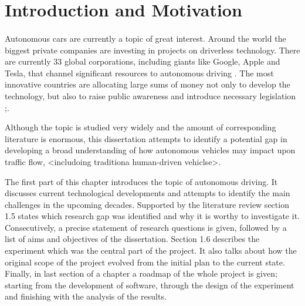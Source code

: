 \documentclass[11pt,english]{article}
\begin{document}
\tableofcontents %


\newpage

\section{Introduction and Motivation} %

\paragraph{}
Autonomous cars are currently a topic of  great interest.  Around the world the biggest private companies are investing in projects on driverless technology. There are currently 33 global corporations, including giants like Google, Apple and Tesla, that channel significant resources to autonomous driving \citep{33comp}. The most innovative countries are allocating large sums of money not only to develop the technology, but also to raise public awareness and introduce necessary legislation \citep{pathwaytodriverless};\citep{pathwaytodriverless2}. 

\par
Although the topic is studied very widely and the amount of corresponding literature is enormous, this dissertation attempts to identify a potential gap in developing a broad understanding of how autonomous vehicles may impact upon traffic flow, <includoing traditiona human-driven vehiclse>. 



\par
The first part of this chapter introduces the topic of autonomous driving. It discusses current technological developments and attempts to identify the main challenges in the upcoming decades. Supported by the literature review section 1.5 states which research gap was identified and why it is worthy to investigate it. Consecutively, a precise statement of research questions is given, followed by a list of aims and objectives of the dissertation. Section 1.6 describes the experiment which was the central part of the project. It also talks about how the original scope of the project evolved from the initial plan to the current state. Finally, in last section of a chapter a roadmap of the whole project is given; starting from the development of software, through the design of the experiment and finishing with the analysis of the results.
\end{document}
